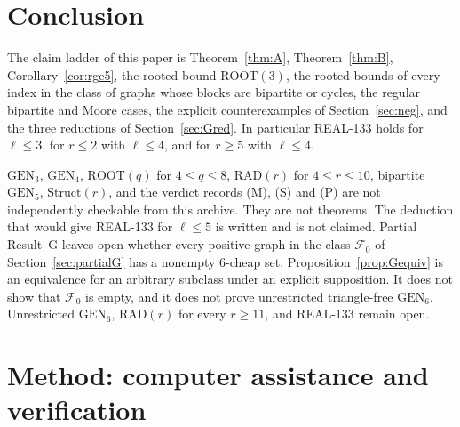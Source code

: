 \documentclass[11pt]{amsart}
\theoremstyle{definition}
\theoremstyle{remark}
\newcommand{\lr}{\ell}
\newcommand{\GEN}{\mathrm{GEN}}
\newcommand{\RAD}{\mathrm{RAD}}
\newcommand{\ROOT}{\mathrm{ROOT}}
\begin{document}
\section{Conclusion}\label{sec:conclusion}

The claim ladder of this paper is Theorem~\ref{thm:A}, Theorem~\ref{thm:B}, Corollary~\ref{cor:rge5}, the rooted bound $\ROOT(3)$, the rooted bounds of every index in the class of graphs whose blocks are bipartite or cycles, the regular bipartite and Moore cases, the explicit counterexamples of Section~\ref{sec:neg}, and the three reductions of Section~\ref{sec:Gred}. In particular REAL-133 holds for $\lr\le 3$, for $r\le 2$ with $\lr\le 4$, and for $r\ge 5$ with $\lr\le 4$.

$\GEN_3$, $\GEN_4$, $\ROOT(q)$ for $4\le q\le 8$, $\RAD(r)$ for $4\le r\le 10$, bipartite $\GEN_5$, $\mathrm{Struct}(r)$, and the verdict records (M), (S) and (P) are not independently checkable from this archive. They are not theorems. The deduction that would give REAL-133 for $\lr\le 5$ is written and is not claimed. Partial Result~G leaves open whether every positive graph in the class $\mathcal F_0$ of Section~\ref{sec:partialG} has a nonempty $6$-cheap set. Proposition~\ref{prop:Gequiv} is an equivalence for an arbitrary subclass under an explicit supposition. It does not show that $\mathcal F_0$ is empty, and it does not prove unrestricted triangle-free $\GEN_6$. Unrestricted $\GEN_6$, $\RAD(r)$ for every $r\ge 11$, and REAL-133 remain open.

\section{Method: computer assistance and verification}\label{sec:method}
\end{document}
